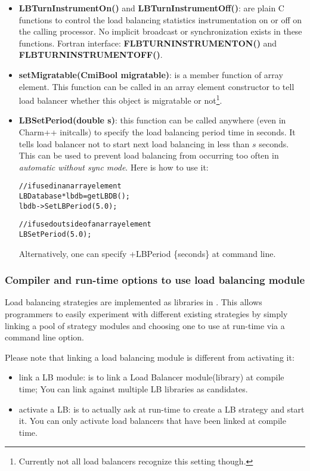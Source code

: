\begin{itemize}
\item {\bf LBTurnInstrumentOn()} and {\bf LBTurnInstrumentOff()}: are plain C
      functions to control the load balancing statistics instrumentation
      on or off on the calling processor. No implicit broadcast or 
      synchronization exists in these functions.
      Fortran interface: {\bf FLBTURNINSTRUMENTON()} and {\bf FLBTURNINSTRUMENTOFF()}.
\item {\bf setMigratable(CmiBool migratable)}: is a member function of array
      element. This function can be called 
      in an array element constructor to tell load balancer whether this object
      is migratable or not\footnote{Currently not all load balancers 
      recognize this setting though.}.
\item {\bf LBSetPeriod(double s)}: this function can be called
      anywhere (even in Charm++ initcalls) to specify 
      the load balancing period time in seconds. 
      It tells load balancer not to start next 
      load balancing in less than $s$ seconds. This can be used to prevent 
      load balancing from occurring too often in 
      {\em automatic without sync mode}. Here is how to use it:
      \begin{alltt}
// if used in an array element
LBDatabase *lbdb = getLBDB();
lbdb->SetLBPeriod(5.0);

// if used outside of an array element
LBSetPeriod(5.0);
\end{alltt}
      Alternatively, one can specify +LBPeriod \{seconds\} at command line.
\end{itemize}

\subsubsection{Compiler and run-time options to use load balancing module}

\label{lbOption}

Load balancing strategies are implemented as libraries in \charmpp{}. This
allows programmers to easily experiment with different existing strategies 
by simply linking a pool of strategy modules and choosing
one to use at run-time via a command line option.

Please note that linking a load balancing module is different from activating it:
\begin{itemize}
\item link a LB module: is to link a Load Balancer module(library) at 
   compile time; You can link against multiple LB libraries as candidates.
\item activate a LB: is to actually ask at run-time to create a LB strategy and 
   start it. You can only activate load balancers that have been linked at
   compile time.
\end{itemize}


